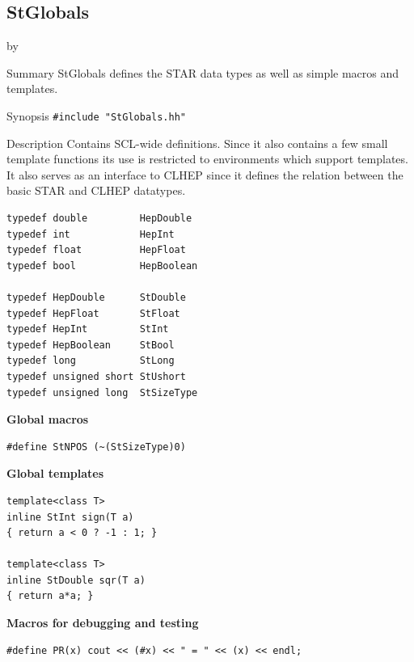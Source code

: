 \documentclass[twoside]{article}
\newcommand{\entrylabel}[1]{\mbox{\textbf{{#1}}}\hfil}%
\newenvironment{entry}
{\begin{list}{}%
    {\renewcommand{\makelabel}{\entrylabel}%
     \setlength{\labelwidth}{90pt}%
     \setlength{\leftmargin}{\labelwidth}
     \advance\leftmargin by \labelsep%
      }%
    }%
  {\end{list}}
\newcommand{\Entrylabel}[1]%
{\raisebox{0pt}[1ex][0pt]{\makebox[\labelwidth][l]%
    {\parbox[t]{\labelwidth}{\hspace{0pt}\textbf{{#1}}}}}}
\newenvironment{Entry}%
{\renewcommand{\entrylabel}{\Entrylabel}\begin{entry}}%
  {\end{entry}}
\begin{document}
\subsection{StGlobals}
\begin{Entry}
\item[Summary]
    StGlobals defines the STAR data types as well as simple
    macros and templates.   

\item[Synopsis]
    \verb+#include "StGlobals.hh"+
    
    
\item[Description]
    Contains SCL-wide definitions. Since it also contains
    a few small template functions its use is restricted to
    environments which support templates. It also serves as an interface to
    CLHEP since it defines the relation between the basic STAR and
    CLHEP datatypes.
    
\begin{verbatim}
typedef double         HepDouble
typedef int            HepInt 
typedef float          HepFloat
typedef bool           HepBoolean

typedef HepDouble      StDouble
typedef HepFloat       StFloat
typedef HepInt         StInt
typedef HepBoolean     StBool
typedef long           StLong
typedef unsigned short StUshort
typedef unsigned long  StSizeType
\end{verbatim}

{\bf Global macros} \\ 
\begin{verbatim}  
#define StNPOS (~(StSizeType)0)
\end{verbatim}

{\bf Global templates} \\  
\begin{verbatim}
template<class T>
inline StInt sign(T a)
{ return a < 0 ? -1 : 1; }

template<class T>
inline StDouble sqr(T a)
{ return a*a; }
\end{verbatim}

{\bf Macros for debugging and testing} \\ 
\begin{verbatim}
#define PR(x) cout << (#x) << " = " << (x) << endl;
\end{verbatim}
\end{Entry}
\newpage
\end{document}
